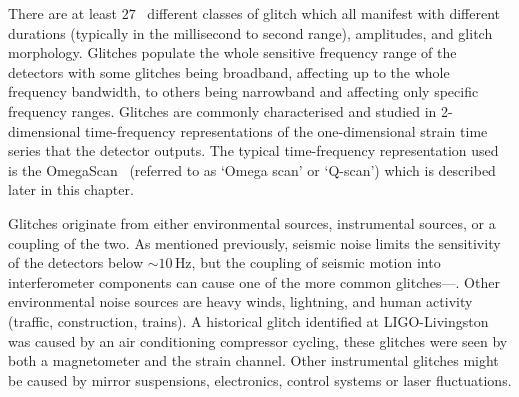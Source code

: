 
There are at least $27$~\cite{gravityspy:2023, gravityspy:2024} different classes of glitch which all manifest with different durations (typically in the millisecond to second range), amplitudes, and glitch morphology. Glitches populate the whole sensitive frequency range of the detectors with some glitches being broadband, affecting up to the whole frequency bandwidth, to others being narrowband and affecting only specific frequency ranges. Glitches are commonly characterised and studied in 2-dimensional time-frequency representations of the one-dimensional strain time series that the detector outputs. The typical time-frequency representation used is the OmegaScan~\cite{qscan:2004} (referred to as `Omega scan' or `Q-scan') which is described later in this chapter.


Glitches originate from either environmental sources, instrumental sources, or a coupling of the two. As mentioned previously, seismic noise limits the sensitivity of the detectors below ${\sim}10 \, \text{Hz}$, but the coupling of seismic motion into interferometer components can cause one of the more common glitches---\scl. Other environmental noise sources are heavy winds, lightning, and human activity (traffic, construction, trains). A historical glitch identified at LIGO-Livingston was caused by an air conditioning compressor cycling, these glitches were seen by both a magnetometer and the \gwadj strain channel. Other instrumental glitches might be caused by mirror suspensions, electronics, control systems or laser fluctuations.


